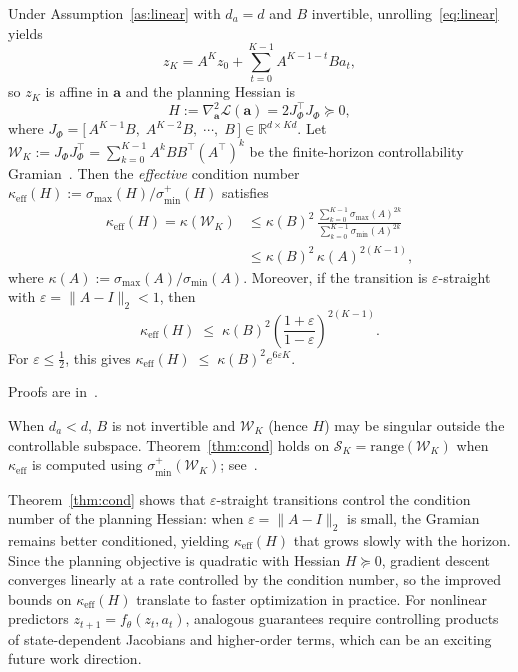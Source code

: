 \begin{theorem}\label{thm:cond}
Under Assumption~\ref{as:linear} with $d_a=d$ and $B$ invertible, unrolling~\eqref{eq:linear} yields
\[
z_K=A^{K}z_0+\sum_{t=0}^{K-1}A^{K-1-t}Ba_t,
\]
so $z_K$ is affine in $\mathbf a$ and the planning Hessian is
\[
H:=\nabla_{\mathbf a}^2\mathcal L(\mathbf a)=2J_\Phi^\top J_\Phi\succeq 0,
\]
where
$J_\Phi=\bigl[\,A^{K-1}B,\; A^{K-2}B,\; \cdots,\; B\,\bigr]
\in\mathbb R^{d\times Kd}.
$
Let $\mathcal W_K:=J_\Phi J_\Phi^\top=\sum_{k=0}^{K-1}A^kBB^\top(A^\top)^k$ be the finite-horizon
controllability Gramian~\citep{kailath1980linear,sontag1998mathematical,chen1999linear}. Then the
\emph{effective} condition number $\kappa_{\mathrm{eff}}(H):=\sigma_{\max}(H)/\sigma_{\min}^+(H)$ satisfies
\begin{equation}\label{eq:kappaA}
\begin{aligned}
\kappa_{\mathrm{eff}}(H)=\kappa(\mathcal W_K)
&\le
\kappa(B)^2\,
\frac{\sum_{k=0}^{K-1}\sigma_{\max}(A)^{2k}}
     {\sum_{k=0}^{K-1}\sigma_{\min}(A)^{2k}} \\
&\le
\kappa(B)^2\,\kappa(A)^{2(K-1)},
\end{aligned}
\end{equation}
where $\kappa(A):=\sigma_{\max}(A)/\sigma_{\min}(A)$.
Moreover, if the transition is $\varepsilon$-straight with $\varepsilon=\|A-I\|_2<1$, then
\begin{equation}\label{eq:eps_bound}
\kappa_{\mathrm{eff}}(H)
\;\le\;
\kappa(B)^2\left(\frac{1+\varepsilon}{1-\varepsilon}\right)^{2(K-1)}.
\end{equation}
For $\varepsilon\le\tfrac12$, this gives $
\kappa_{\mathrm{eff}}(H)
\;\le\;
\kappa(B)^2 e^{6\varepsilon K}$.

Proofs are in~.
\end{theorem}

\begin{remark}\label{rem:lowdim}
When $d_a<d$, $B$ is not invertible and $\mathcal W_K$ (hence $H$) may be singular outside the controllable subspace.
Theorem~\ref{thm:cond} holds on $\mathcal S_K=\mathrm{range}(\mathcal W_K)$ when $\kappa_{\mathrm{eff}}$ is computed
using $\sigma_{\min}^+(\mathcal W_K)$; see~.
\end{remark}


Theorem~\ref{thm:cond} shows that $\varepsilon$-straight transitions control the condition number of the planning Hessian: when $\varepsilon=\|A-I\|_2$ is small, the Gramian remains better conditioned, yielding $\kappa_{\mathrm{eff}}(H)$ that grows slowly with the horizon. Since the planning objective is quadratic with Hessian $H\succeq 0$, gradient descent converges linearly at a rate controlled by the condition number, so the improved bounds on $\kappa_{\mathrm{eff}}(H)$ translate to faster optimization in practice. For nonlinear predictors $z_{t+1}=f_\theta(z_t,a_t)$, analogous guarantees require controlling products of state-dependent Jacobians and higher-order terms, which can be an exciting future work direction. 

